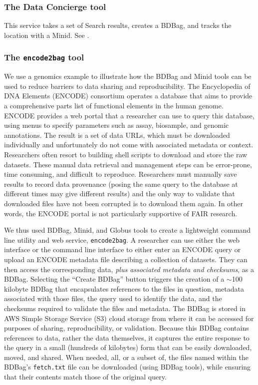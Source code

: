 \documentclass[11pt]{article}
\begin{document}
\subsubsection{The Data Concierge tool}

This service takes a set of Search results, creates a BDBag, and tracks the location with a Minid.
See .


\subsubsection{The \texttt{encode2bag} tool}

We use a genomics example to illustrate how the BDBag and Minid tools can be used to reduce
barriers to data sharing and reproducibility.
The Encyclopedia of DNA Elements (ENCODE) consortium operates a database that aims to provide a
comprehensive parts list of functional elements in the human genome.
ENCODE provides a web portal that a researcher can use to query this database,
using menus to specify parameters such as assay, biosample, and genomic annotations.
The result is a set of data URLs,
which must be downloaded individually and unfortunately do not come with associated metadata or context.
Researchers often resort to building shell scripts to download and store the raw datasets.
These manual data retrieval and management steps can be error-prone,
time consuming, and difficult to reproduce.
Researchers must manually save results to record data provenance (posing the same query to the database at different
times may give different results)
and the only way to validate that downloaded files have not been corrupted is to download them again.
In other words, the ENCODE portal is not particularly supportive of FAIR research.

We thus used BDBag, Minid, and Globus tools to create a lightweight command line utility and web service, \texttt{encode2bag}.
A researcher can use either the web interface or the command line interface to
either enter an ENCODE query or upload an ENCODE metadata file describing a collection of datasets.
They can then access the corresponding data, \emph{plus associated metadata and checksums}, as a BDBag.
Selecting the ``Create BDBag'' button triggers the creation of a $\sim$100 kilobyte BDBag that encapsulates references to the files in question, metadata associated with those files, the query used to identify the data, and the checksums required to validate the files and metadata.
The BDBag is stored in AWS Simple Storage Service (S3) cloud storage from where it can be accessed for purposes of sharing, reproducibility, or validation.
Because this BDBag contains references to data, rather the data themselves, it captures the entire response to the query in a small (hundreds of kilobytes) form that can be easily downloaded, moved, and shared.
When needed, all, or a subset of, the files named within the BDBag's \texttt{fetch.txt} file can be downloaded
(using BDBag tools), while ensuring that their contents match those of the original query.
\end{document}
